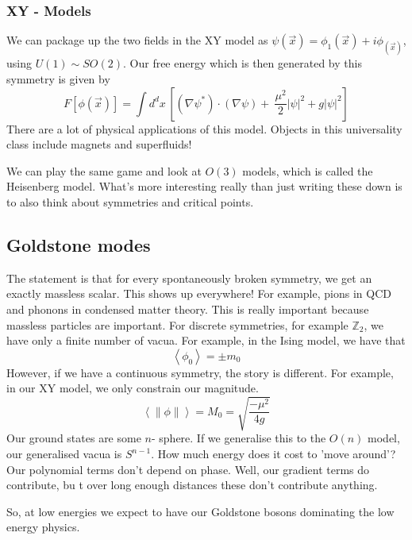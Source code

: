 \subsubsection{XY - Models} 
We can package up the two fields in the XY model 
as $ \psi ( \vec{x} )  = \phi _  1 ( \vec{x} )  + i \phi_ ( \vec{x} ) $, 
using $ U ( 1 ) \sim SO ( 2) $. 
Our free energy which is then generated by this symmetry is 
given by 
 \[
	 F [ \phi ( \vec{x} ) ] = \int  d^ d x \, 
	 \left[  ( \nabla \psi ^ * ) \cdot  ( \nabla \psi ) + \
 \frac{\mu ^ 2 }{ 2 } | \psi | ^ 2 + g | \psi | ^ 2\right] 
\] There are a lot of physical applications of this model. 
Objects in this universality class include magnets and superfluids! 

We can play the same game and look at $ O ( 3 ) $ models, which is called the 
Heisenberg model. 
What's more interesting really than just writing these down is to 
also think about symmetries and critical points. 

\subsection{Goldstone modes} 
The statement is that for every spontaneously broken symmetry, 
we get an exactly massless scalar. This shows up everywhere! 
For example, pions in QCD and phonons in condensed matter theory. 
This is really important because massless particles are important. 
For discrete symmetries, for example $ \mathbb{ Z } _ 2 $, 
we have only a finite number of vacua. For example, in the Ising model, 
we have that 
\[
 \left< \phi _ 0  \right>  = \pm m _ 0 
\] However, if we have a continuous symmetry, 
the story is different. For example, in our XY model, 
we only constrain our magnitude. 
\[
 \left<   \|\phi \| \right> = M _ 0  = \sqrt{ \frac{ - \mu ^ 2 }{ 4 g }}  
\] Our ground states are some $ n  $- sphere. 
If we generalise this to the $ O ( n ) $ model, 
our generalised vacua is $ S ^{ n - 1 }$. 
How much energy does it cost to 'move around'? 
Our polynomial terms don't depend on phase. 
Well, our gradient terms do contribute, bu t
over long enough distances these don't contribute anything. 

So, at low energies we expect to have our Goldstone bosons 
dominating the low energy physics. 

